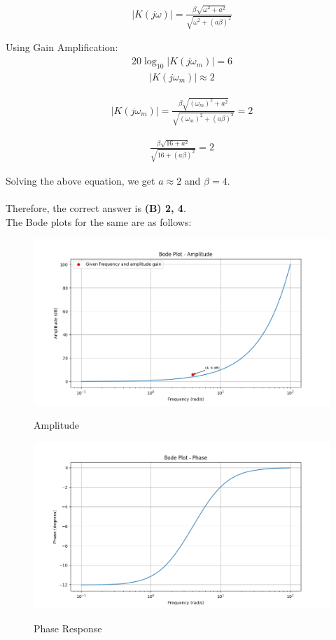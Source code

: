 \documentclass[journal,12pt,twocolumn]{IEEEtran}
\theoremstyle{remark}
\begin{document}
    \begin{align}
    |K(j\omega)| =\frac{\beta \sqrt{\omega^2 + a^2}}{\sqrt{\omega^2 + (a\beta)^2}}
    \end{align}
    
    Using Gain Amplification:
    \begin{align}
     20\log_{10}|K(j\omega_m)| = 6
     \end{align}
     \begin{align}
     |K(j\omega_m)| \approx  2
     \end{align}
     
    \begin{align}
    |K(j\omega_m)| =\frac{\beta \sqrt{(\omega_m)^2 + a^2}}{\sqrt{(\omega_m)^2 + (a\beta)^2}}=2
    \end{align}
    
    \begin{align}
    \frac{\beta \sqrt{16 + a^2}}{\sqrt{16 + (a\beta)^2}}=2
    \end{align}
    
    Solving the above equation, we get \(a \approx 2\) and \(\beta = 4\).\\\\ Therefore, the correct answer is \textbf{(B) 2, 4}.\\
    The Bode plots for the same are as follows:
  \begin{figure}[h!]
  \centering
  \caption{Amplitude}
  \includegraphics[width=\columnwidth]{figs/amplitude.png}
  \label{fig:bode_Amplitude}
\end{figure}

\begin{figure}[h!]
  \centering
  \caption{Phase Response}
  \includegraphics[width=\columnwidth]{figs/phase.png}
  \label{fig:bode_Phase}
\end{figure}
\end{document}
